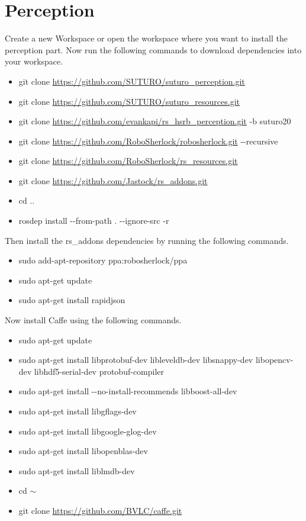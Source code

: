 \documentclass[main.tex]{subfiles}
\begin{document}
 \section{Perception}
 Create a new Workspace or open the workspace where you want to install the perception part. Now run the following commands to download dependencies into your workspace.
 
 \begin{itemize}

\item git clone \url{https://github.com/SUTURO/suturo_perception.git}
\item git clone \url{https://github.com/SUTURO/suturo_resources.git} 
\item git clone \url{https://github.com/evankapi/rs_hsrb_perception.git} -b suturo20
\item git clone \url{https://github.com/RoboSherlock/robosherlock.git} -{}-recursive
\item git clone \url{https://github.com/RoboSherlock/rs_resources.git}
\item git clone \url{https://github.com/Jastock/rs_addons.git}
\item cd ..
\item rosdep install -{}-from-path . -{}-ignore-src -r 
\end{itemize}
 
 Then install the rs\_addons dependencies by running the following commands.
 \begin{itemize}
\item sudo add-apt-repository ppa:robosherlock/ppa
\item sudo apt-get update
\item sudo apt-get install rapidjson 
 \end{itemize}
 
 Now install Caffe using the following commands.
 \begin{itemize}
\item sudo apt-get update
\item sudo apt-get install libprotobuf-dev libleveldb-dev libsnappy-dev libopencv-dev libhdf5-serial-dev protobuf-compiler
\item sudo apt-get install -{}-no-install-recommends libboost-all-dev
\item sudo apt-get install libgflags-dev
\item sudo apt-get install libgoogle-glog-dev
\item sudo apt-get install libopenblas-dev
\item sudo apt-get install liblmdb-dev
\item cd $\sim$
\item git clone \url{https://github.com/BVLC/caffe.git}
 \end{itemize}
 
\end{document}
